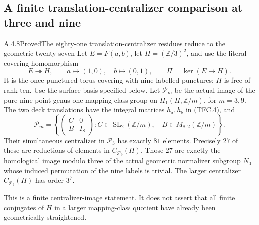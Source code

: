 \subsection{A finite translation-centralizer comparison at three and nine}

\begin{result}{A.4.8}{Proved}{The eighty-one translation-centralizer residues reduce to the geometric twenty-seven}
Let $E=F(a,b)$, let
$H=(\mathbb Z/3)^2$, and use the literal covering homomorphism
\[
 E\twoheadrightarrow H,\qquad a\longmapsto(1,0),
 \quad b\longmapsto(0,1),\qquad \Pi=\ker(E\to H).
                                                               \tag{TFC.1}
\]
It is the once-punctured-torus covering with nine labelled punctures;
$\Pi$ is free of rank ten.  Use the surface basis specified below.
Let $\mathcal P_m$ be the actual image of the pure nine-point genus-one
mapping class group on $H_1(\Pi,\mathbb Z/m)$, for $m=3,9$.
The two deck translations have the integral matrices $h_a,h_b$ in
(TFC.4), and
\[
 \mathcal P_m=\left\{
 \begin{pmatrix}C&0\\B&I_8\end{pmatrix}:
 C\in\operatorname{SL}_2(\mathbb Z/m),\quad
 B\in M_{8,2}(\mathbb Z/m)\right\}.                       \tag{TFC.2}
\]
Their simultaneous centralizer in $\mathcal P_3$ has exactly $81$
elements.  Precisely $27$ of these are reductions of elements in
$C_{\mathcal P_9}(H)$.  Those $27$ are exactly the homological image
modulo three of the actual geometric normalizer subgroup $N_0$
whose induced permutation of the nine labels is trivial.
The larger centralizer $C_{\mathcal P_9}(H)$ has order $3^7$.

This is a finite centralizer-image statement.  It does not assert
that all finite conjugates of $H$ in a larger mapping-class quotient
have already been geometrically straightened.
\end{result}

